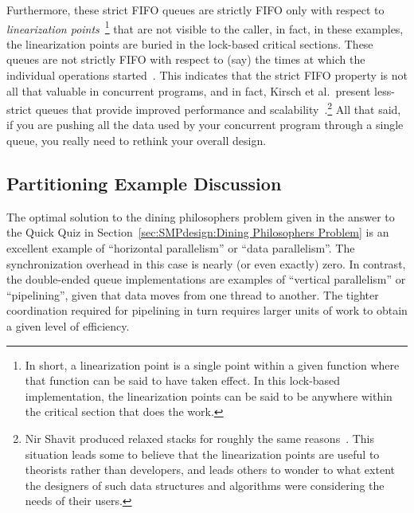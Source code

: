 Furthermore, these strict FIFO queues are strictly FIFO only with
respect to
\emph{linearization points}~\cite{Herlihy:1990:LCC:78969.78972}\footnote{
	In short, a linearization point is a single point within a given
	function where that function can be said to have taken effect.
	In this lock-based implementation, the linearization points
	can be said to be anywhere within the critical section that
	does the work.}
that are not visible to the caller, in fact, in these examples,
the linearization points are buried in the lock-based critical
sections.
These queues are not strictly FIFO with respect to (say) the times at which
the individual operations started~\cite{AndreasHaas2012FIFOisnt}.
This indicates that the strict FIFO property is not all that valuable
in concurrent programs, and in fact, Kirsch et al.\ present less-strict
queues that provide improved performance and
scalability~\cite{ChristophMKirsch2012FIFOisntTR}.\footnote{
	Nir Shavit produced relaxed stacks for roughly the same
	reasons~\cite{Shavit:2011:DSM:1897852.1897873}.
	This situation leads some to believe that the linearization
	points are useful to theorists rather than developers, and
	leads others to wonder to what extent the designers of such
	data structures and algorithms were considering the needs
	of their users.}
All that said, if you are pushing all the data used by your concurrent
program through a single queue, you really need to rethink your
overall design.

\subsection{Partitioning Example Discussion}
\label{sec:SMPdesign:Partitioning Example Discussion}

The optimal solution to the dining philosophers problem given in
the answer to the Quick Quiz in
Section~\ref{sec:SMPdesign:Dining Philosophers Problem}
is an excellent example of ``horizontal parallelism'' or
``data parallelism''.
The synchronization overhead in this case is nearly (or even exactly)
zero.
In contrast, the double-ended
queue implementations are examples of ``vertical parallelism'' or
``pipelining'', given that data moves from one thread to another.
The tighter coordination required for pipelining in turn requires
larger units of work to obtain a given level of efficiency.

